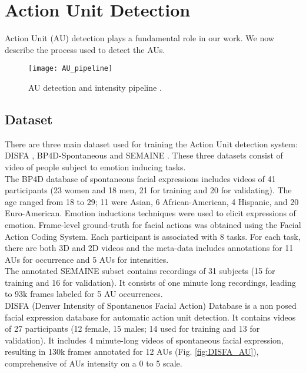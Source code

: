 \section{Action Unit Detection}
Action Unit (AU) detection plays a fundamental role in our work. We now describe the process used to detect the AUs.

\begin{figure}[H]
	\centering
	\texttt{[image: AU\_pipeline]}
	\caption{AU detection and intensity pipeline \cite{Baltru2015}.}
	\label{fig:AU_pipeline}
\end{figure}

\subsection{Dataset}
There are three main dataset used for training the Action Unit detection system:  DISFA \cite{DISFA}, BP4D-Spontaneous \cite{BP4D-Spontaneous} and SEMAINE \cite{SEMAINE}. These three datasets consist of video of people subject to emotion inducing tasks.\\

The BP4D database of spontaneous facial expressions includes videos of 41 participants (23 women and 18 men, 21 for training and 20 for validating). The age ranged from 18 to 29; 11 were Asian, 6 African-American, 4 Hispanic, and 20 Euro-American. Emotion inductions techniques were used to elicit expressions of emotion. Frame-level ground-truth for facial actions was obtained using the Facial Action Coding System. Each participant is associated with 8 tasks. For each task, there are both 3D and 2D videos and the meta-data includes annotations for 11 AUs for occurrence and 5 AUs for intensities.\\

The annotated SEMAINE subset contains recordings of 31 subjects (15 for training and 16 for validation). It consists of one minute long recordings, leading to 93k frames labeled for 5 AU occurrences.\\

DISFA (Denver Intensity of Spontaneuos Facial Action) Database is a non posed facial expression database for automatic action unit detection. It contains videos of 27 participants (12 female, 15 males; 14 used for training and 13 for validation). It includes 4 minute-long videos of spontaneous facial expression, resulting in 130k frames annotated for 12 AUs (Fig. \ref{fig:DISFA_AU}), comprehensive of AUs intensity on a 0 to 5 scale.\\


